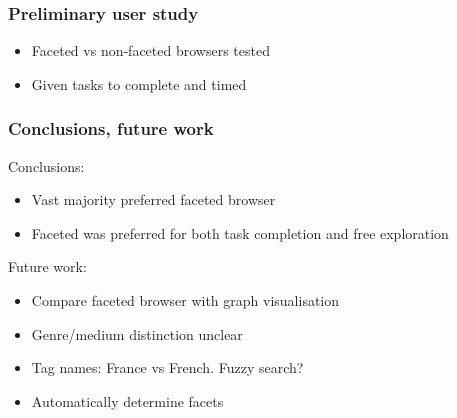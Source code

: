 \documentclass{beamer}
\begin{document}
\begin{frame}
    \frametitle{Preliminary user study}
\begin{figure}[!t]
  \label{fig:results}
  \end{figure}
        \begin{itemize}
            \item Faceted vs non-faceted browsers tested
            \item Given tasks to complete and timed
        \end{itemize}
\end{frame}

\begin{frame}
    \frametitle{Conclusions, future work}
        Conclusions:
        \begin{itemize}
            \item Vast majority preferred faceted browser
            \item Faceted was preferred for both task completion and free exploration
        \end{itemize}
        Future work:
        \begin{itemize}
            \item Compare faceted browser with graph visualisation
            \item Genre/medium distinction unclear
            \item Tag names: France vs French. Fuzzy search?
            \item Automatically determine facets
        \end{itemize}
\end{frame}
\end{document}

